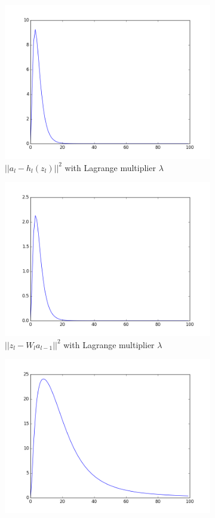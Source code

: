 \documentclass[letterpaper, 10 pt, conference]{ieeeconf}  %
\begin{document}
\begin{figure}
\centering
\begin{subfigure}{0.8\columnwidth}
\centering
\includegraphics[width=0.7\columnwidth]{figure/aConstraint_has_lambda.png}
\caption{$||a_l-h_l(z_l)||^2$ with Lagrange multiplier $\lambda$}
\end{subfigure}
\begin{subfigure}{0.8\columnwidth}
\centering
\includegraphics[width=0.7\columnwidth]{figure/zConstraint_has_lambda.png}
\caption{$||z_l-W_la_{l-1}||^2$ with Lagrange multiplier $\lambda$}
\end{subfigure}
\begin{subfigure}{0.8\columnwidth}
\centering
\includegraphics[width=0.7\columnwidth]{figure/aConstraint_no_lambda.png}

\end{subfigure}
\end{figure}
\end{document}
